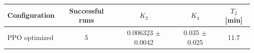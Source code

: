 \begin{tabular}{lcccc}
\toprule
Configuration & Successful runs & $K_2$ & $K_4$ & $T_2$ [min] \\
\midrule
PPO optimized & 5 & 0.006323 $\pm$ 0.0042 & 0.035 $\pm$ 0.025 & 11.7 \\
\bottomrule
\end{tabular}
